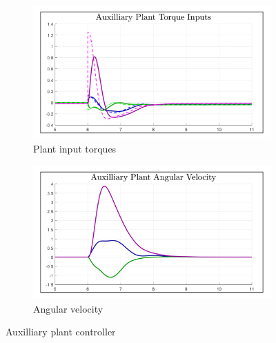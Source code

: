 \par
\begin{figure}[htbp]\ContinuedFloat
\begin{subfigure}{0.49\textwidth}
\centering
\includegraphics[width=\textwidth]{graphs/XPD_Torque}
\caption{Plant input torques}
\label{fig:XPD_Torque}
\end{subfigure}
\begin{subfigure}{0.49\textwidth}
\centering
\includegraphics[width=\textwidth]{graphs/XPD_Angular}
\caption{Angular velocity}
\label{fig:XPD_Angular}
\end{subfigure}
\caption{Auxilliary plant controller}
\end{figure}
